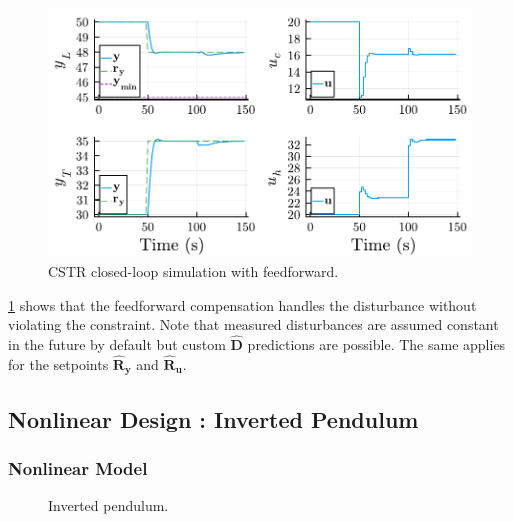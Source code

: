 \begin{figure}[h]
    \centering
    \includegraphics[width=\columnwidth]{fig/plot_LinMPC2.pdf}
    \caption{CSTR closed-loop simulation with feedforward.}
    \label{fig:plot_LinMPC2}
\end{figure}

\cref{fig:plot_LinMPC2} shows that the feedforward compensation handles the disturbance without violating the constraint. Note that measured disturbances are assumed constant in the future by default but custom $\mathbf{\hat{D}}$ predictions are possible. The same applies for the setpoints $\mathbf{\hat{R}_y}$ and $\mathbf{\hat{R}_u}$.

\subsection{Nonlinear Design : Inverted Pendulum}
\label{sec.nonlinear_design}

\subsubsection{Nonlinear Model}

\begin{figure}[b]
    \centering
    
    \caption{Inverted pendulum.}
    \label{fig:pendulum}
\end{figure}

